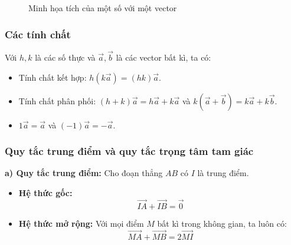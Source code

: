 \documentclass[12pt]{article}
\begin{document}
	\begin{figure}[H]
		\centering
		\caption{Minh họa tích của một số với một vector}
	\end{figure}
	
	\subsubsection{Các tính chất}
	Với $h, k$ là các số thực và $\vec{a}, \vec{b}$ là các vector bất kì, ta có:
	\begin{itemize}
		\item Tính chất kết hợp: $h(k\vec{a}) = (hk)\vec{a}$.
		\item Tính chất phân phối: $(h+k)\vec{a} = h\vec{a} + k\vec{a}$ và $k(\vec{a} + \vec{b}) = k\vec{a} + k\vec{b}$.
		\item $1\vec{a} = \vec{a}$ và $(-1)\vec{a} = -\vec{a}$.
	\end{itemize}
	
	\subsubsection{Quy tắc trung điểm và quy tắc trọng tâm tam giác}
	
	\textbf{a) Quy tắc trung điểm:}
	Cho đoạn thẳng $AB$ có $I$ là trung điểm.
	\begin{itemize}
		\item \textbf{Hệ thức gốc:}
		$$ \overrightarrow{IA} + \overrightarrow{IB} = \vec{0} $$
		\item \textbf{Hệ thức mở rộng:} Với mọi điểm $M$ bất kì trong không gian, ta luôn có:
		$$ \overrightarrow{MA} + \overrightarrow{MB} = 2\overrightarrow{MI} $$
	\end{itemize}
	
\end{document}
